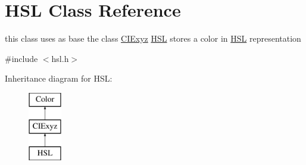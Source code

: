 \hypertarget{class_h_s_l}{}\section{H\+SL Class Reference}
\label{class_h_s_l}


this class uses as base the class \hyperlink{class_c_i_exyz}{C\+I\+Exyz} \hyperlink{class_h_s_l}{H\+SL} stores a color in \hyperlink{class_h_s_l}{H\+SL} representation  




{\ttfamily \#include $<$hsl.\+h$>$}

Inheritance diagram for H\+SL\+:\begin{figure}[H]
\begin{center}
\leavevmode
\includegraphics[height=3.000000cm]{class_h_s_l}
\end{center}
\end{figure}
